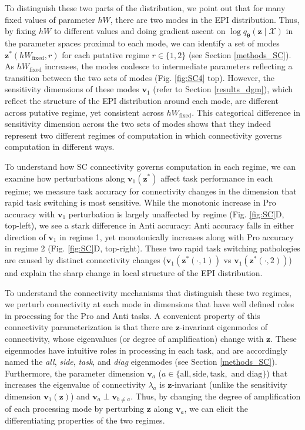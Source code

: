 \documentclass[11pt]{article}
\begin{document}
To distinguish these two parts of the distribution, we point out that for many fixed values of parameter $hW$, there are two modes in the EPI distribution.  
Thus, by fixing $hW$ to different values and doing gradient ascent on $\log q_{\bm{\theta}}(\mathbf{z} \mid \mathcal{X})$ in the parameter spaces proximal to each mode, we can identify a set of modes $\mathbf{z}^*(hW_{\text{fixed}}, r)$ for each putative regime $r \in \{1, 2\}$ (see Section \ref{methods_SC}).
As $hW_{\text{fixed}}$ increases, the modes coalesce to intermediate parameters reflecting a transition between the two sets of modes (Fig. \ref{fig:SC4} top).
However, the sensitivity dimensions of these modes $\mathbf{v}_1$ (refer to Section \ref{results_dgm}), which reflect the structure of the EPI distribution around each mode, are different across putative regime, yet consistent across $hW_{\text{fixed}}$.
This categorical difference in sensitivity dimension across the two sets of modes shows that they indeed represent two different regimes of computation in which connectivity governs computation in different ways.

To understand how SC connectivity governs computation in each regime, we can examine how perturbations along $\mathbf{v}_1(\mathbf{z}^*)$ affect task performance in each regime; we measure task accuracy for connectivity changes in the dimension that rapid task switching is most sensitive.
While the monotonic increase in Pro accuracy with $\mathbf{v}_1$ perturbation is largely unaffected by regime (Fig. \ref{fig:SC}D, top-left), we see a stark difference in Anti accuracy: Anti accuracy falls in either direction of $\mathbf{v}_1$ in regime 1, yet monotonically increases along with Pro accuracy in regime 2 (Fig. \ref{fig:SC}D, top-right).
These two rapid task switching pathologies are caused by distinct connectivity changes ($\mathbf{v}_1(\mathbf{z}^*(\cdot, 1))$ vs $\mathbf{v}_1(\mathbf{z}^*(\cdot, 2))$) and explain the sharp change in local structure of the EPI distribution.

To understand the connectivity mechanisms that distinguish these two regimes, we perturb connectivity at each mode in dimensions that have well defined roles in processing for the Pro and Anti tasks.
A convenient property of this connectivity parameterization is that there are $\mathbf{z}$-invariant eigenmodes of connectivity, whose eigenvalues (or degree of amplification) change with $\mathbf{z}$.
These eigenmodes have intuitive roles in processing in each task, and are accordingly named the \textit{all}, \textit{side}, \textit{task}, and \textit{diag} eigenmodes (see Section \ref{methods_SC}).
Furthermore, the parameter dimension $\mathbf{v}_a$ ($a \in \{\text{all}, \text{side}, \text{task}, \text{ and diag}\}$) that increases the eigenvalue of connectivity $\lambda_a$ is $\mathbf{z}$-invariant (unlike the sensitivity dimension $\mathbf{v}_1(\mathbf{z})$) and $\mathbf{v}_a \perp \mathbf{v}_{b \neq a}$.
Thus, by changing the degree of amplification of each processing mode by  perturbing $\mathbf{z}$ along $\mathbf{v}_a$, we can elicit the differentiating properties of the two regimes.
\end{document}
